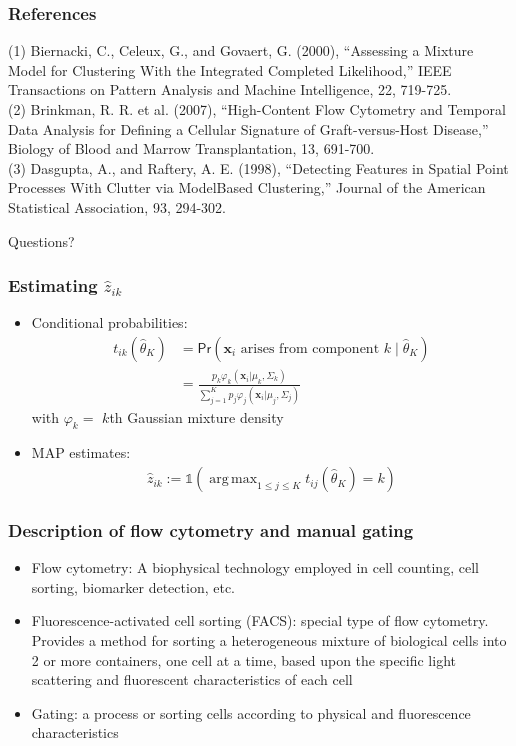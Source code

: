 \documentclass[mathserif,compress]{beamer}
\newcommand*\ba{\[ \begin{aligned}}
\newcommand*\ea{\end{aligned} \]}
\newcommand*\ind[1]{\mathbb{1}\left(#1\right)}
\newcommand*\estim[1]{\widehat{#1}}
\DeclareMathOperator*{\argmax}{arg\;max}
\renewcommand\;{\,}
\renewcommand\phi{\varphi}
\renewcommand\Pr[1]{ \mathsf{Pr}\left(#1\right) }
\newcommand{\bx}{\mathbf{x}}
\begin{document}
\begin{frame}\frametitle{References}
(1)
Biernacki, C., Celeux, G., and Govaert, G. (2000), ``Assessing a Mixture Model for Clustering With the Integrated
Completed Likelihood,'' IEEE Transactions on Pattern Analysis and Machine Intelligence, 22, 719-725.
\\ \bigskip
(2) Brinkman, R. R. et al. (2007), ``High-Content Flow Cytometry and Temporal Data Analysis for Defining a Cellular Signature of
Graft-versus-Host Disease,'' Biology of Blood and Marrow Transplantation, 13, 691-700.
\\ \bigskip
(3) Dasgupta, A., and Raftery, A. E. (1998), ``Detecting Features in Spatial Point Processes With Clutter via ModelBased
Clustering,'' Journal of the American Statistical Association, 93, 294-302. 
\end{frame}

\begin{frame}
\begin{center}
\Large
Questions?
\end{center}
\end{frame}

\begin{frame}\frametitle{Estimating $\estim z_{ik}$}
\begin{itemize}
\item[]
Conditional probabilities:
\ba
t_{ik}(\estim\theta_K) & = \Pr{\bx_i \text{ arises from component $k$} \mid \estim\theta_K } \\
	& = \frac{ p_k \phi_k(\bx_i | \mu_k, \Sigma_k)  }
 	{ \sum_{j=1}^K p_j \phi_j(\bx_i | \mu_j, \Sigma_j) }
\ea
with $\phi_k = $ $k$th Gaussian mixture density
\medskip
\item[]
MAP estimates:
\ba
\estim z_{ik} := \ind{ \argmax_{1 \le j \le K} t_{ij}(\estim\theta_K) = k }
\ea
\end{itemize}
\end{frame}

\begin{frame}\frametitle{Description of flow cytometry and manual gating}
\begin{itemize}
\item
Flow cytometry:
A biophysical technology employed in cell counting, cell sorting, biomarker detection, etc.
\medskip
\item
Fluorescence-activated cell sorting (FACS): special type of flow cytometry. Provides a method for sorting a heterogeneous mixture of biological cells into 2 or more containers, one cell at a time, based upon the specific light scattering and fluorescent characteristics of each cell
\medskip
\item
Gating: a process or sorting cells according to physical and fluorescence characteristics
\end{itemize}
\end{frame}
\end{document}
